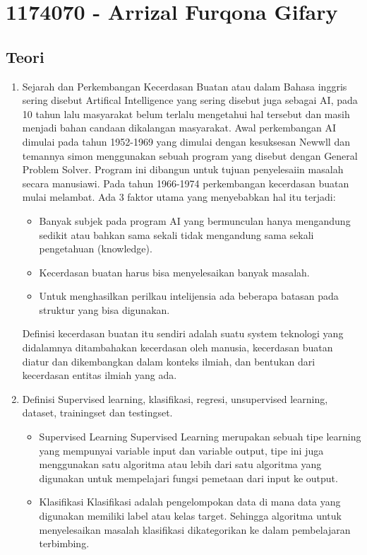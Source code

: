 \section{1174070 - Arrizal Furqona Gifary}
\subsection{Teori}
\begin{enumerate}
	\item Sejarah dan Perkembangan
	\hfill\break
	Kecerdasan Buatan atau dalam Bahasa inggris sering disebut Artifical Intelligence yang sering disebut juga sebagai AI, pada 10 tahun lalu masyarakat belum terlalu mengetahui hal tersebut dan masih menjadi bahan candaan dikalangan masyarakat. Awal perkembangan AI dimulai pada tahun 1952-1969 yang dimulai dengan kesuksesan Newwll dan temannya simon menggunakan sebuah program yang disebut dengan General Problem Solver. Program ini dibangun untuk tujuan penyelesaiin masalah secara manusiawi. Pada tahun 1966-1974 perkembangan kecerdasan buatan mulai melambat. Ada 3 faktor utama yang menyebabkan hal itu terjadi:
	\begin{itemize}
		\item Banyak subjek pada program AI yang bermunculan hanya mengandung sedikit atau bahkan sama sekali tidak  mengandung sama sekali pengetahuan (knowledge).
		\item Kecerdasan buatan harus bisa menyelesaikan banyak masalah.
		\item Untuk menghasilkan perilkau intelijensia ada beberapa batasan pada struktur yang bisa digunakan.
	\end{itemize}
	Definisi kecerdasan buatan itu sendiri adalah suatu system teknologi yang didalamnya ditambahakan kecerdasan oleh manusia, kecerdasan buatan diatur dan dikembangkan dalam konteks ilmiah, dan bentukan dari kecerdasan entitas ilmiah yang ada.
	\item Definisi
	\hfill\break
	Supervised learning, klasifikasi, regresi, unsupervised learning, dataset, trainingset dan testingset.
	\begin{itemize}
		\item Supervised Learning
		\hfill\break
		Supervised Learning merupakan sebuah tipe learning yang mempunyai variable input dan variable output, tipe ini juga menggunakan satu algoritma atau lebih dari satu algoritma yang digunakan untuk mempelajari fungsi  pemetaan dari input ke output.
		\item Klasifikasi
		\hfill\break
		Klasifikasi adalah pengelompokan data di mana data yang digunakan memiliki label atau kelas target. Sehingga algoritma untuk menyelesaikan masalah klasifikasi dikategorikan ke dalam pembelajaran terbimbing.

\end{itemize}
\end{enumerate}
